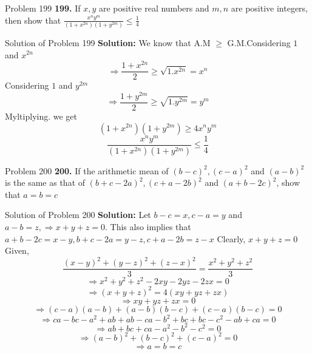 \documentclass[aspectratio=1610,8pt]{beamer}
\begin{document}
\begin{frame}{Problem 199}
  \textbf{199.} If $x,y$ are positive real numbers and $m, n$ are positive integers, then show that $\frac{x^ny^m}{(1 + x^{2n})(1 +
    y^{2m})}\leq \frac{1}{4}$
\end{frame}
\begin{frame}{Solution of Problem 199}
  \textbf{Solution:} We know that A.M $\geq$ G.M.Considering $1$ and $x^{2n}$
  $$\Rightarrow \frac{1 + x^{2n}}{2}\geq \sqrt{1.x^{2n}} = x^n$$
  Considering $1$ and $y^{2m}$
  $$\Rightarrow \frac{1 + y^{2m}}{2}\geq \sqrt{1.y^{2m}} = y^m$$
  Myltiplying. we get
  $$(1 + x^{2n})(1 + y^{2m})\geq 4x^ny^m$$
  $$\frac{x^ny^m}{(1 + x^{2n})(1 + y^{2m})}\leq \frac{1}{4}$$
\end{frame}
\begin{frame}{Problem 200}
  \textbf{200.} If the arithmetic mean of $(b - c)^2, (c - a)^2$ and $(a - b)^2$ is the same as that of $(b + c - 2a)^2, (c + a -
  2b)^2$ and $(a + b - 2c)^2$, show that $a = b = c$
\end{frame}
\begin{frame}{Solution of Problem 200}
  \textbf{Solution:} Let $b - c = x, c - a = y$ and $a - b = z,\Rightarrow x + y + z = 0.$ This also implies that $a + b - 2c = x -
  y, b + c - 2a = y - z, c + a - 2b = z - x$
  \linebreak\linebreak
  Clearly, $x + y + z = 0$
  \linebreak\linebreak
  Given, $$\frac{(x - y)^2 + (y - z)^2 + (z - x)^2}{3} = \frac{x^2 + y^2 + z^2}{3}$$
  $$\Rightarrow x^2 + y^2 + z^2 - 2xy - 2yz - 2zx = 0$$
  $$\Rightarrow (x + y + z)^2 = 4(xy + yz + zx)$$
  $$\Rightarrow xy + yz + zx = 0$$
  $$\Rightarrow (c - a)(a - b) + (a - b)(b - c) + (c - a)(b - c) = 0$$
  $$\Rightarrow ca - bc - a^2 + ab + ab - ca - b^2 + bc + bc - c^2 - ab + ca = 0$$
  $$\Rightarrow ab + bc + ca - a^2 - b^2 - c^2 = 0$$
  $$\Rightarrow (a - b)^2 + (b - c)^2 + (c - a)^2 = 0$$
  $$\Rightarrow a = b = c$$
\end{frame}
\end{document}
